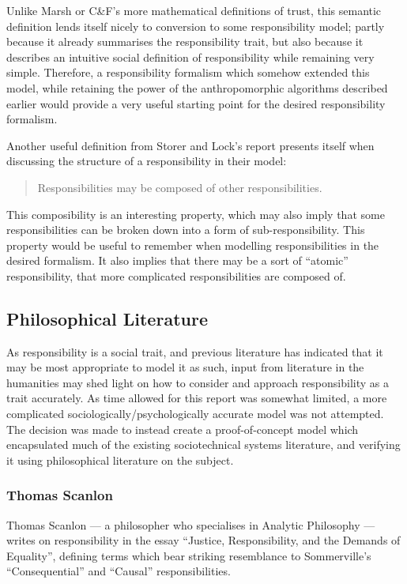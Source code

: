 Unlike Marsh or C\&F's more mathematical definitions of trust, this semantic definition lends itself nicely to conversion to some responsibility model; partly because it already summarises the responsibility trait, but also because it describes an intuitive social definition of responsibility while remaining very simple. Therefore, a responsibility formalism which somehow extended this model, while retaining the power of the anthropomorphic algorithms described earlier would provide a very useful starting point for the desired responsibility formalism.\par

Another useful definition from Storer and Lock's report presents itself when discussing the structure of a responsibility in their model:

\begin{quotation}
    Responsibilities may be composed of other responsibilities.
\end{quotation}

This composibility is an interesting property, which may also imply that some responsibilities can be broken down into a form of sub-responsibility. This property would be useful to remember when modelling responsibilities in the desired formalism. It also implies that there may be a sort of ``atomic'' responsibility, that more complicated responsibilities are composed of.

\subsection{Philosophical Literature}  %
As responsibility is a social trait, and previous literature has indicated that it may be most appropriate to model it as such, input from literature in the humanities may shed light on how to consider and approach responsibility as a trait accurately. As time allowed for this report was somewhat limited, a more complicated sociologically/psychologically accurate model was not attempted. The decision was made to instead create a proof-of-concept model which encapsulated much of the existing sociotechnical systems literature, and verifying it using philosophical literature on the subject.

\subsubsection{Thomas Scanlon}  %
Thomas Scanlon --- a philosopher who specialises in Analytic Philosophy --- writes on responsibility in the essay ``Justice, Responsibility, and the Demands of Equality'', defining terms which bear striking resemblance to Sommerville's ``Consequential'' and ``Causal'' responsibilities.\par

